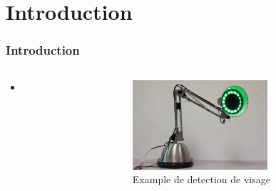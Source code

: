 \section{Introduction}
\begin{frame}
  \frametitle{Introduction}
  \begin{columns}[c]
    \begin{column}[T]{.5\textwidth}
      \begin{itemize}
        \item
      \end{itemize}
    \end{column}
    \begin{column}[T]{.5\textwidth}
      \begin{figure}
        \begin{center}
          \includegraphics[width=5cm]{../img/pinokio.JPG}
          \caption{Example de detection de visage}
        \end{center}
      \end{figure}
    \end{column}
  \end{columns}   
\end{frame}
